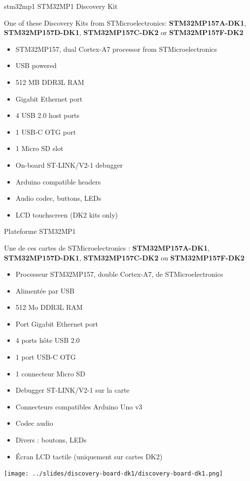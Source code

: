 {stm32mp1}
{STM32MP1 Discovery Kit}
{
  One of these Discovery Kits from STMicroelectronics: {\bf
  STM32MP157A-DK1}, {\bf STM32MP157D-DK1}, {\bf STM32MP157C-DK2} or
  {\bf STM32MP157F-DK2}
  \vspace{0.5cm}
  \begin{itemize}
  \item STM32MP157, dual Cortex-A7 processor from STMicroelectronics
  \item USB powered
  \item 512 MB DDR3L RAM
  \item Gigabit Ethernet port
  \item 4 USB 2.0 host ports
  \item 1 USB-C OTG port
  \item 1 Micro SD slot
  \item On-board ST-LINK/V2-1 debugger
  \item Arduino compatible headers
  \item Audio codec, buttons, LEDs
  \item LCD touchscreen (DK2 kits only)
  \vspace{-0.7cm}
  \end{itemize}
}
{Plateforme STM32MP1}
{
  Une de ces cartes de STMicroelectronics : {\bf
  STM32MP157A-DK1}, {\bf STM32MP157D-DK1}, {\bf STM32MP157C-DK2} ou
  {\bf STM32MP157F-DK2}
  \vspace{0.5cm}
  \begin{itemize}
  \item Processeur STM32MP157, double Cortex-A7, de STMicroelectronics
  \item Alimentée par USB
  \item 512 Mo DDR3L RAM
  \item Port Gigabit Ethernet port
  \item 4 ports hôte USB 2.0
  \item 1 port USB-C OTG
  \item 1 connecteur Micro SD
  \item Debugger ST-LINK/V2-1 sur la carte
  \item Connecteurs compatibles Arduino Uno v3
  \item Codec audio
  \item Divers : boutons, LEDs
  \item Écran LCD tactile (uniquement sur cartes DK2)
  \vspace{-0.7cm}
  \end{itemize}
}
{
  \begin{center}
    \texttt{[image: ../slides/discovery-board-dk1/discovery-board-dk1.png]}
  \end{center}
}

